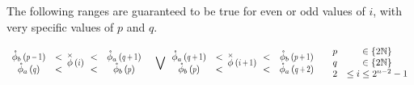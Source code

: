 The following ranges are guaranteed to be true for even or odd values of $i$, with very specific values of $p$ and $q$.
%


\begin{align*}
\begin{array}{cc}
  \extremaTheta{b}{p-1} & < \\
  \extremaTheta{a} {q} & < 
\end{array}
&\thetaX{i} 
\begin{array}{cc}
  < & \extremaTheta{a}{q+1}  \\
  < & \extremaTheta{b}{p}  
\end{array} 
& \bigvee
\begin{array}{cc}
  \extremaTheta{a}{q+1} & < \\
  \extremaTheta{b} {p} & < 
\end{array}
&\thetaX{i+1} 
\begin{array}{cc}
  < & \extremaTheta{b}{p+1}  \\
  < & \extremaTheta{a}{q+2}  
\end{array} & 
\begin{array}{cc}
p  &\in \{ 2 \mathbb{N}  \}  \\
q  &\in \{ 2 \mathbb{N}  \}  \\
2  & \le i  \le 2^{n-2} -1
\end{array}
\end{align*}


